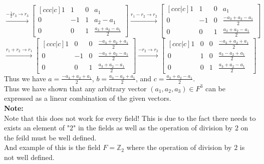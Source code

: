 \documentclass{article}
\begin{document}
$$ \xrightarrow{-\frac{1}{2}r_3 \rightarrow r_3} \begin{bmatrix}[ccc|c]
    1 & 1 & 0 & a_1\\
    0 & -1 & 1 & a_2 - a_1\\
    0 & 0 & 1 & \frac{a_3 + a_2 - a_1}{2}
\end{bmatrix} \xrightarrow{r_1 - r_2 \rightarrow r_2} \begin{bmatrix}[ccc|c]
    1 & 1 & 0 & a_1\\
    0 & -1 & 0 & \frac{-a_3 + a_2 - a_1}{2}\\
    0 & 0 & 1 & \frac{a_3 + a_2 - a_1}{2}
\end{bmatrix}$$
$$ \xrightarrow{r_1 + r_2 \rightarrow r_1} \begin{bmatrix}[ccc|c]
    1 & 0 & 0 & \frac{-a_3 + a_2 + a_1}{2} \\
    0 & -1 & 0 &  \frac{-a_3 + a_2 - a_1}{2}\\
    0 & 0 & 1 & \frac{a_3 + a_2 - a_1}{2}
\end{bmatrix} \xrightarrow{-r_2 \rightarrow r_2} \begin{bmatrix}[ccc|c]
    1 & 0 & 0 & \frac{-a_3 + a_2 + a_1}{2} \\
    0 & 1 & 0 &  \frac{a_3 - a_2 + a_1}{2}\\
    0 & 0 & 1 & \frac{a_3 + a_2 - a_1}{2}
\end{bmatrix}$$
Thus we have $a = \frac{-a_3 + a_2 + a_1}{2}$, $b = \frac{a_3 - a_2 + a_1}{2}$, and $c = \frac{a_3 + a_2 - a_1}{2}$.\\
Thus we have shown that any arbitrary vector $(a_1,a_2,a_3) \in F^3$ can be expressed as a linear combination of the given vectors.\\
\textbf{Note: }\\
Note that this does not work for every field! This is due to the fact there needs to exists an element of "$2$" in the fields as well as the operation of division by $2$ on the feild must be well defined.\\ 
And example of this is the field $F = \mathds{Z}_2$ where the operation of division by $2$ is not well defined.\\
\end{document}

